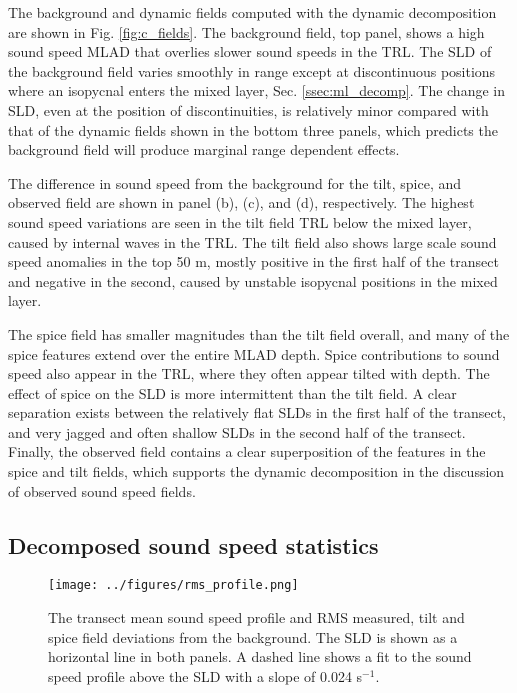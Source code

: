 \documentclass[preprint,NumberedRefs]{JASA}
\begin{document}
The background and dynamic fields computed with the dynamic decomposition are shown in Fig. \ref{fig:c_fields}. The background field, top panel, shows a high sound speed MLAD that overlies slower sound speeds in the TRL. The SLD of the background field varies smoothly in range except at discontinuous positions where an isopycnal enters the mixed layer, Sec. \ref{ssec:ml_decomp}. The change in SLD, even at the position of discontinuities, is relatively minor compared with that of the dynamic fields shown in the bottom three panels, which predicts the background field will produce marginal range dependent effects.

The difference in sound speed from the background for the tilt, spice, and observed field are shown in panel (b), (c), and (d), respectively. The highest sound speed variations are seen in the tilt field TRL below the mixed layer, caused by internal waves in the TRL\cite{colosi21}. The tilt field also shows large scale sound speed anomalies in the top 50 m, mostly positive in the first half of the transect and negative in the second, caused by unstable isopycnal positions in the mixed layer.

The spice field has smaller magnitudes than the tilt field overall, and many of the spice features extend over the entire MLAD depth. Spice contributions to sound speed also appear in the TRL, where they often appear tilted with depth. The effect of spice on the SLD is more intermittent than the tilt field. A clear separation exists between the relatively flat SLDs in the first half of the transect, and very jagged and often shallow SLDs in the second half of the transect. Finally, the observed field contains a clear superposition of the features in the spice and tilt fields, which supports the dynamic decomposition in the discussion of observed sound speed fields.

\subsection{Decomposed sound speed statistics}
\begin{figure}
\texttt{[image: ../figures/rms\_profile.png]}
        \caption{\label{fig:c_rms}{The transect mean sound speed profile and RMS measured, tilt and spice field deviations from the background. The SLD is shown as a horizontal line in both panels. A dashed line shows a fit to the sound speed profile above the SLD with a slope of 0.024 s$^{-1}$.}}
\end{figure}
\end{document}
